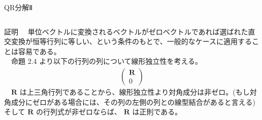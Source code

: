 \documentclass[dvipdfmx,10pt,presentation]{beamer}
\begin{document}
\begin{frame}[label={sec:org8f5c7a2}]{QR分解Ⅱ}
\begin{columns}
\begin{column}{1.00\columnwidth}
\begin{block}{証明}
　単位ベクトルに変換されるベクトルがゼロベクトルであれば選ばれた直交変換が恒等行列に等しい、という条件のもとで、一般的なケースに適用することは容易である。\\
　命題 2.4 より以下の行列の列について線形独立性を考える。\\
\begin{align*}
\begin{pmatrix}
\bm{R} \\
0
\end{pmatrix}
\end{align*}
　\(\bm{R}\) は上三角行列であることから、線形独立性より対角成分は非ゼロ。(もし対角成分にゼロがある場合には、その列の左側の列との線型結合があると言える) そして \(\bm{R}\) の行列式が非ゼロならば、 \(\bm{R}\) は正則である。\\
\end{block}
\end{column}
\end{columns}
\end{frame}
\end{document}
